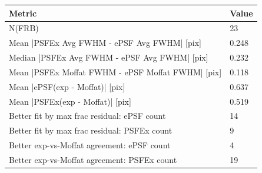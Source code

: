 \begin{tabular}{lp{2.2cm}}
\hline
 Metric & Value \\
\hline
 N(FRB) & 23 \\
 Mean |PSFEx Avg FWHM - ePSF Avg FWHM| [pix] & 0.248 \\
 Median |PSFEx Avg FWHM - ePSF Avg FWHM| [pix] & 0.232 \\
 Mean |PSFEx Moffat FWHM - ePSF Moffat FWHM| [pix] & 0.118 \\
 Mean |ePSF(exp - Moffat)| [pix] & 0.637 \\
 Mean |PSFEx(exp - Moffat)| [pix] & 0.519 \\
 Better fit by max frac residual: ePSF count & 14 \\
 Better fit by max frac residual: PSFEx count & 9 \\
 Better exp-vs-Moffat agreement: ePSF count & 4 \\
 Better exp-vs-Moffat agreement: PSFEx count & 19 \\
\hline
\end{tabular}